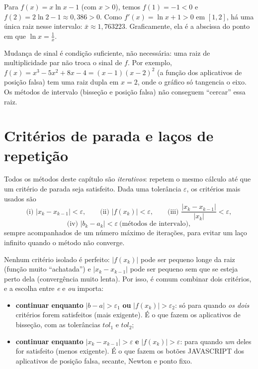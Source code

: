 \begin{exemplo}
Para $f(x)=x\ln x-1$ (com $x>0$), temos $f(1)=-1<0$ e $f(2)=2\ln2-1\approx0{,}386>0$.
Como $f'(x)=\ln x+1>0$ em $[1,2]$, há uma única raiz nesse intervalo:
$\bar x\approx1{,}763223$. Graficamente, ela é a abscissa do ponto em que $\ln x=\frac1x$.
\end{exemplo}

\begin{observacao}
Mudança de sinal é condição suficiente, não necessária: uma raiz de multiplicidade par não
troca o sinal de $f$. Por exemplo, $f(x)=x^3-5x^2+8x-4=(x-1)(x-2)^2$ (a função dos aplicativos
de posição falsa) tem uma raiz dupla em $x=2$, onde o gráfico só tangencia o eixo. Os métodos de
intervalo (bisseção e posição falsa) não conseguem ``cercar'' essa raiz.
\end{observacao}

\section{Critérios de parada e laços de repetição}

Todos os métodos deste capítulo são \emph{iterativos}: repetem o mesmo cálculo até que um
critério de parada seja satisfeito. Dada uma tolerância $\varepsilon$, os critérios mais usados são
\[
\text{(i) } |x_k-x_{k-1}|<\varepsilon,\qquad
\text{(ii) } |f(x_k)|<\varepsilon,\qquad
\text{(iii) } \frac{|x_k-x_{k-1}|}{|x_k|}<\varepsilon,
\]
\[
\text{(iv) } |b_k-a_k|<\varepsilon\ \text{(métodos de intervalo)},
\]
sempre acompanhados de um número máximo de iterações, para evitar um laço infinito quando o
método não converge.

Nenhum critério isolado é perfeito: $|f(x_k)|$ pode ser pequeno longe da raiz (função muito
``achatada'') e $|x_k-x_{k-1}|$ pode ser pequeno sem que se esteja perto dela (convergência muito
lenta). Por isso, é comum combinar dois critérios, e a escolha entre \emph{e} e \emph{ou} importa:
\begin{itemize}[nosep]
  \item \textbf{continuar enquanto} $|b-a|>\varepsilon_1$ \textbf{ou} $|f(x_k)|>\varepsilon_2$:
        só para quando \emph{os dois} critérios forem satisfeitos (mais exigente). É o que fazem os
        aplicativos de bisseção, com as tolerâncias $tol_1$ e $tol_2$;
  \item \textbf{continuar enquanto} $|x_k-x_{k-1}|>\varepsilon$ \textbf{e} $|f(x_k)|>\varepsilon$:
        para quando \emph{um} deles for satisfeito (menos exigente). É o que fazem os botões
        JAVASCRIPT dos aplicativos de posição falsa, secante, Newton e ponto fixo.
\end{itemize}

